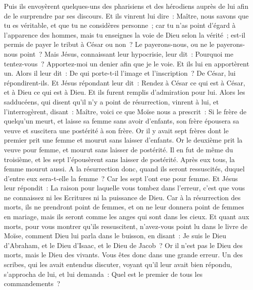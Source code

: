 \begin{multicols}{2}
Puis ils envoyèrent quelques-uns des pharisiens et des hérodiens auprès de lui afin de le surprendre par ses discours.
Et ils vinrent lui dire~: Maître, nous savons que tu es véritable, et que tu ne considères personne~; car tu n'as point d'égard à l'apparence des hommes, mais tu enseignes la voie de Dieu selon la vérité~; est-il permis de payer le tribut à César ou non~? Le payerons-nous, ou ne le payerons-nous point~?
Mais Jésus, connaissant leur hypocrisie, leur dit~: Pourquoi me tentez-vous~? Apportez-moi un denier afin que je le voie.
Et ils lui en apportèrent un. Alors il leur dit~: De qui porte-t-il l'image et l'inscription~? De César, lui répondirent-ils.
Et Jésus répondant leur dit~: Rendez à César ce qui est à César, et à Dieu ce qui est à Dieu. Et ils furent remplis d'admiration pour lui.
Alors les sadducéens, qui disent qu'il n'y a point de résurrection, vinrent à lui, et l'interrogèrent, disant~:
Maître, voici ce que Moïse nous a prescrit~: Si le frère de quelqu'un meurt, et laisse sa femme sans avoir d'enfants, son frère épousera sa veuve et suscitera une postérité à son frère.
Or il y avait sept frères dont le premier prit une femme et mourut sans laisser d'enfants.
Or le deuxième prit la veuve pour femme, et mourut sans laisser de postérité. Il en fut de même du troisième,
et les sept l'épousèrent sans laisser de postérité. Après eux tous, la femme mourut aussi.
A la résurrection donc, quand ils seront ressuscités, duquel d'entre eux sera-t-elle la femme~? Car les sept l'ont eue pour femme.
Et Jésus leur répondit~: La raison pour laquelle vous tombez dans l'erreur, c'est que vous ne connaissez ni les Ecritures ni la puissance de Dieu.
Car à la résurrection des morts, ils ne prendront point de femmes, et on ne leur donnera point de femmes en mariage, mais ils seront comme les anges qui sont dans les cieux.
Et quant aux morts, pour vous montrer qu'ils ressuscitent, n'avez-vous point lu dans le livre de Moïse, comment Dieu lui parla dans le buisson, en disant~: Je suis le Dieu d'Abraham, et le Dieu d'Isaac, et le Dieu de Jacob~?
Or il n'est pas le Dieu des morts, mais le Dieu des vivants. Vous êtes donc dans une grande erreur.
Un des scribes, qui les avait entendus discuter, voyant qu'il leur avait bien répondu, s'approcha de lui, et lui demanda~: Quel est le premier de tous les commandements~?

\end{multicols}
